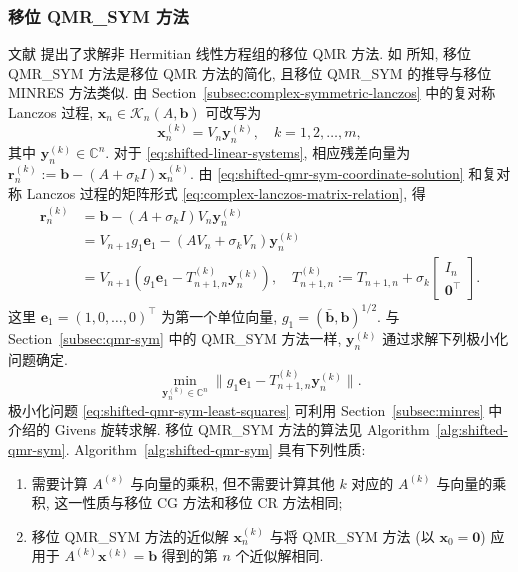 \subsubsection{{移位 QMR\_SYM 方法}}\label{subsec:shifted-qmr-sym}
{文献  提出了求解非 Hermitian 线性方程组的移位 QMR 方法. 如  所知, 移位 QMR\_SYM 方法是移位 QMR 方法的简化, 且移位 QMR\_SYM 的推导与移位 MINRES 方法类似.}
{由 Section\ \ref{subsec:complex-symmetric-lanczos} 中的复对称 Lanczos 过程, $\bm x_n\in\mathcal K_n(A,\bm b)$ 可改写为}
\begin{equation}\label{eq:shifted-qmr-sym-coordinate-solution}\bm x_n^{(k)}=V_n\bm y_n^{(k)},\quad k=1,2,\ldots,m,\end{equation}
{其中 $\bm y_n^{(k)}\in\mathbb C^n$. 对于 \eqref{eq:shifted-linear-systems}, 相应残差向量为 $\bm r_n^{(k)}:=\bm b-(A+\sigma_k I)\bm x_n^{(k)}$. 由 \eqref{eq:shifted-qmr-sym-coordinate-solution} 和复对称 Lanczos 过程的矩阵形式 \eqref{eq:complex-lanczos-matrix-relation}, 得}
\begin{equation}\label{eq:shifted-qmr-sym-projected-residual}\begin{aligned}\bm r_n^{(k)}&=\bm b-(A+\sigma_k I)V_n\bm y_n^{(k)}\\&=V_{n+1}g_1\bm e_1-(AV_n+\sigma_kV_n)\bm y_n^{(k)}\\&=V_{n+1}(g_1\bm e_1-T_{n+1,n}^{(k)}\bm y_n^{(k)}),\quad T_{n+1,n}^{(k)}:=T_{n+1,n}+\sigma_k\begin{bmatrix}I_n\\\bm0^{\top}\end{bmatrix}.\end{aligned}\end{equation}
{这里 $\bm e_1=(1,0,\ldots,0)^{\top}$ 为第一个单位向量, $g_1=(\bar{\bm b},\bm b)^{1/2}$. 与 Section\ \ref{subsec:qmr-sym} 中的 QMR\_SYM 方法一样, $\bm y_n^{(k)}$ 通过求解下列极小化问题确定.}
\begin{equation}\label{eq:shifted-qmr-sym-least-squares}\min_{\bm y_n^{(k)}\in\mathbb C^n}\|g_1\bm e_1-T_{n+1,n}^{(k)}\bm y_n^{(k)}\|.\end{equation}
{极小化问题 \eqref{eq:shifted-qmr-sym-least-squares} 可利用 Section\ \ref{subsec:minres} 中介绍的 Givens 旋转求解. 移位 QMR\_SYM 方法的算法见 Algorithm\ \ref{alg:shifted-qmr-sym}.}
{Algorithm\ \ref{alg:shifted-qmr-sym} 具有下列性质:}
\begin{enumerate}
\item {需要计算 $A^{(s)}$ 与向量的乘积, 但不需要计算其他 $k$ 对应的 $A^{(k)}$ 与向量的乘积, 这一性质与移位 CG 方法和移位 CR 方法相同;}
\item {移位 QMR\_SYM 方法的近似解 $\bm x_n^{(k)}$ 与将 QMR\_SYM 方法 (以 $\bm x_0=\bm0$) 应用于 $A^{(k)}\bm x^{(k)}=\bm b$ 得到的第 $n$ 个近似解相同.}
\end{enumerate}
